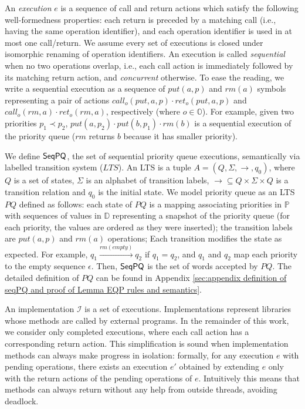 An \emph{execution} $e$ is a sequence of call and return actions which satisfy the following well-formedness properties: each return is preceded by a matching call (i.e., having the same operation identifier), and each operation identifier is used in at most one call/return. We assume every set of executions is closed under isomorphic renaming of operation identifiers. An execution is called \emph{sequential} when no two operations overlap, i.e., each call action is immediately followed by its matching return action, and \emph{concurrent} otherwise. To ease the reading, we write a sequential execution as a sequence of $\textit{put}(a,p)$ and $\textit{rm}(a)$ symbols representing a pair of actions $\textit{call}_o(\textit{put},a,p)\cdot \textit{ret}_o(\textit{put},a,p)$ and $\textit{call}_o(\textit{rm},a)\cdot \textit{ret}_o(\textit{rm},a)$, respectively (where $o\in\mathbb{O}$). For example, given two priorities $p_1 \prec p_2$, $\textit{put}(a,p_2) \cdot \textit{put}(b,p_1) \cdot \textit{rm}(b)$ is a sequential execution of the priority queue ($\textit{rm}$ returns $b$ because it has smaller priority).

We define $\mathsf{SeqPQ}$, the set of sequential priority queue executions, semantically via labelled transition system ($LTS$). An LTS is a tuple $A=(Q,\Sigma,\rightarrow,q_0)$, where $Q$ is a set of states, $\Sigma$ is an alphabet of transition labels, $\rightarrow\subseteq Q\times\Sigma\times Q$ is a transition relation and $q_0$ is the initial state. We model priority queue as an LTS $\textit{PQ}$ defined as follows: each state of $\textit{PQ}$ is a mapping associating priorities in $\mathbb{P}$ with sequences of values in $\mathbb{D}$ representing a snapshot of the priority queue (for each priority, the values are ordered as they were inserted); the transition labels are $\textit{put}(a,p)$ and $\textit{rm}(a)$ operations; Each transition modifies the state as expected. For example, $q_1 \xrightarrow{\textit{rm}(\textit{empty})} q_2$ if $q_1 = q_2$, and $q_1$ and $q_2$ map each priority to the empty sequence $\epsilon$. Then, $\mathsf{SeqPQ}$ is the set of words accepted by $\textit{PQ}$. The detailed definition of $\textit{PQ}$ can be found in Appendix \ref{sec:appendix definition of seqPQ and proof of Lemma EQP rules and semantics}.


An implementation $\mathcal{I}$ is a set of executions. Implementations represent libraries whose methods are called by external programs. In the remainder of this work, we consider only completed executions, where each call action has a corresponding return action. This simplification is sound when implementation methods can always make progress in isolation: formally, for any execution $e$ with pending operations, there exists an execution $e'$ obtained by extending $e$ only with the return actions of the pending operations of $e$. Intuitively this means that methods can always return without any help from outside threads, avoiding deadlock.


